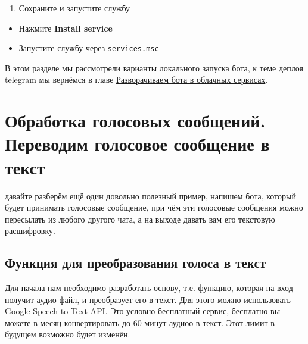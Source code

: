 \documentclass[
]{book}
\providecommand{\tightlist}{%
  \setlength{\itemsep}{0pt}\setlength{\parskip}{0pt}}
\begin{document}
\begin{enumerate}
\def\labelenumi{\arabic{enumi}.}
\setcounter{enumi}{4}
\tightlist
\item
  Сохраните и запустите службу
\end{enumerate}

\begin{itemize}
\tightlist
\item
  Нажмите \textbf{Install service}
\item
  Запустите службу через \texttt{services.msc}
\end{itemize}

В этом разделе мы рассмотрели варианты локального запуска бота, к теме деплоя telegram мы вернёмся в главе \hyperref[ux440ux430ux437ux432ux43eux440ux430ux447ux438ux432ux430ux435ux43c-ux431ux43eux442ux430-ux432-ux43eux431ux43bux430ux447ux43dux44bux445-ux441ux435ux440ux432ux438ux441ux430ux445]{Разворачиваем бота в облачных сервисах}.

\section{Обработка голосовых сообщений. Переводим голосовое сообщение в текст}\label{ux43eux431ux440ux430ux431ux43eux442ux43aux430-ux433ux43eux43bux43eux441ux43eux432ux44bux445-ux441ux43eux43eux431ux449ux435ux43dux438ux439.-ux43fux435ux440ux435ux432ux43eux434ux438ux43c-ux433ux43eux43bux43eux441ux43eux432ux43eux435-ux441ux43eux43eux431ux449ux435ux43dux438ux435-ux432-ux442ux435ux43aux441ux442}

давайте разберём ещё один довольно полезный пример, напишем бота, который будет принимать голосовые сообщение, при чём эти голосовые сообщения можно пересылать из любого другого чата, а на выходе давать вам его текстовую расшифровку.

\subsection{Функция для преобразования голоса в текст}\label{ux444ux443ux43dux43aux446ux438ux44f-ux434ux43bux44f-ux43fux440ux435ux43eux431ux440ux430ux437ux43eux432ux430ux43dux438ux44f-ux433ux43eux43bux43eux441ux430-ux432-ux442ux435ux43aux441ux442}

Для начала нам необходимо разработать основу, т.е. функцию, которая на вход получит аудио файл, и преобразует его в текст. Для этого можно использовать Google Speech-to-Text API. Это условно бесплатный сервис, бесплатно вы можете в месяц конвертировать до 60 минут аудиоо в текст. Этот лимит в будущем возможно будет изменён.
\end{document}
